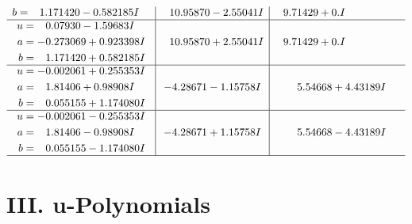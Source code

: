 \documentclass[1p]{elsarticle_modified}
\theoremstyle{definition}
\begin{document}
$$\begin{array}{c|c|c}
\begin{aligned}
b &= \phantom{-}1.171420 - 0.582185 I\end{aligned}
 & \phantom{-}10.95870 - 2.55041 I & \phantom{-}9.71429 + 0. I\phantom{ +0.000000I} \\ \hline\begin{aligned}
u &= \phantom{-}0.07930 - 1.59683 I \\
a &= -0.273069 + 0.923398 I \\
b &= \phantom{-}1.171420 + 0.582185 I\end{aligned}
 & \phantom{-}10.95870 + 2.55041 I & \phantom{-}9.71429 + 0. I\phantom{ +0.000000I} \\ \hline\begin{aligned}
u &= -0.002061 + 0.255353 I \\
a &= \phantom{-}1.81406 + 0.98908 I \\
b &= \phantom{-}0.055155 + 1.174080 I\end{aligned}
 & -4.28671 - 1.15758 I & \phantom{-}5.54668 + 4.43189 I \\ \hline\begin{aligned}
u &= -0.002061 - 0.255353 I \\
a &= \phantom{-}1.81406 - 0.98908 I \\
b &= \phantom{-}0.055155 - 1.174080 I\end{aligned}
 & -4.28671 + 1.15758 I & \phantom{-}5.54668 - 4.43189 I\\
 \hline 
 \end{array}$$\newpage
\newpage\renewcommand{\arraystretch}{1}
\centering \section*{ III. u-Polynomials}
\end{document}
